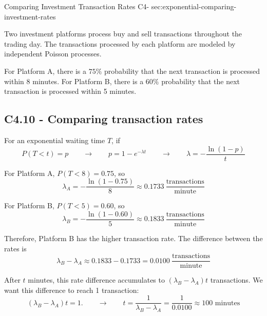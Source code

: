 	\sectionScored
	{Comparing Investment Transaction Rates}
	{C4-}
	{sec:exponential-comparing-investment-rates}
	{
		Two investment platforms process buy and sell transactions throughout
		the trading day. The transactions processed by each platform are
		modeled by independent Poisson processes.
		
		For Platform A, there is a \(75\%\) probability that the next
		transaction is processed within 8 minutes. For Platform B, there is
		a \(60\%\) probability that the next transaction is processed within
		5 minutes.

		
		\subsection*{C4.10 - Comparing transaction rates}
		\label{subsec:c4-compare-rates-investment}
		
		For an exponential waiting time \(T\), if
		$$
		P(T<t)=p
		\qquad \longrightarrow \qquad
		p=1-e^{-\lambda t}
		\qquad \longrightarrow \qquad
		{
			\lambda=-\frac{\ln(1-p)}{t}
		}
		$$
		
		For Platform A, \(P(T<8)=0.75\), so
		$$
		\lambda_A
		=-\frac{\ln(1-0.75)}{8}
		\approx0.1733
		\>\frac{\text{transactions}}{\text{minute}}
		$$
		
		For Platform B, \(P(T<5)=0.60\), so
		$$
		\lambda_B
		=-\frac{\ln(1-0.60)}{5}
		\approx0.1833
		\>\frac{\text{transactions}}{\text{minute}}
		$$
		
		Therefore, Platform B has the higher transaction rate. The difference between the rates is
		$$
		\lambda_B-\lambda_A
		\approx0.1833-0.1733
		=0.0100
		\>\frac{\text{transactions}}{\text{minute}}
		$$
		
		After \(t\) minutes, this rate difference accumulates to
		$
		(\lambda_B-\lambda_A)t
		$
		transactions. We want this difference to reach 1 transaction:
		$$
		(\lambda_B-\lambda_A)t=1.
		\qquad \longrightarrow \qquad
		t
		=\frac{1}{\lambda_B-\lambda_A}
		=\frac{1}{0.0100}
		\approx \boxed{100\text{ minutes}}
		$$
		
	}
	
